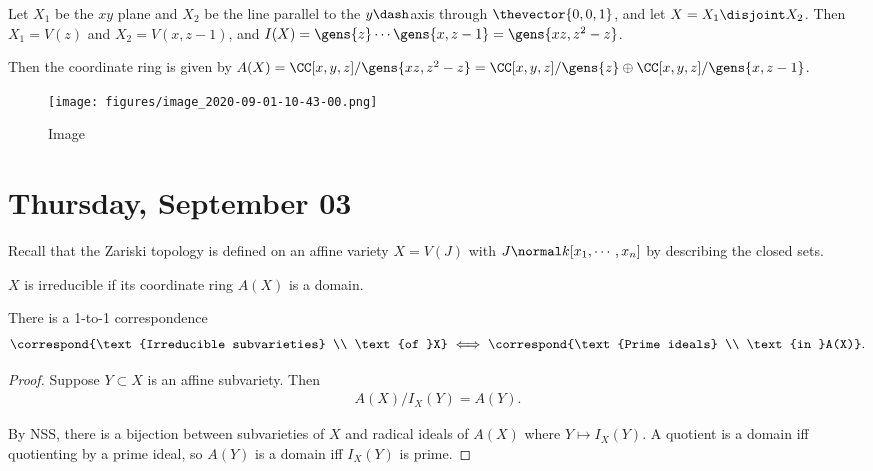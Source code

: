 \begin{example}

Let \(X_1\) be the \(xy\) plane and \(X_2\) be the line parallel to the
\(y\dash\)axis through \(\thevector{0,0,1}\), and let
\(X= X_1 \disjoint X_2\). Then \(X_1 = V(z)\) and \(X_2 = V(x, z-1)\),
and \(I(X) = \gens{z} \cdots \gens{x, z-1}= \gens{xz, z^2 - z}\).

Then the coordinate ring is given by
\(A(X) = \CC[x, y, z] / \gens{xz, z^2 - z} = \CC[x, y, z] / \gens{z} \oplus \CC[x, y,z] / \gens{x, z-1}\).

\begin{figure}
\centering
\texttt{[image: figures/image\_2020-09-01-10-43-00.png]}
\caption{Image}
\end{figure}

\end{example}

\hypertarget{thursday-september-03}{%
\section{Thursday, September 03}\label{thursday-september-03}}

Recall that the Zariski topology is defined on an affine variety
\(X = V(J)\) with \(J \normal k[x_1, \cdots, x_n]\) by describing the
closed sets.

\begin{proposition}[?]

\(X\) is irreducible if its coordinate ring \(A(X)\) is a domain.

\end{proposition}

\begin{proposition}[?]

There is a 1-to-1 correspondence
\begin{align*}  
\correspond{\text{Irreducible subvarieties} \\ \text{of }X}
\iff
\correspond{\text{Prime ideals} \\ \text{in }A(X)}
.\end{align*}

\end{proposition}

\begin{proof}

Suppose \(Y\subset X\) is an affine subvariety. Then
\begin{align*}  
A(X) / I_X(Y) = A(Y)
.\end{align*}

By NSS, there is a bijection between subvarieties of \(X\) and radical
ideals of \(A(X)\) where \(Y\mapsto I_X(Y)\). A quotient is a domain iff
quotienting by a prime ideal, so \(A(Y)\) is a domain iff \(I_X(Y)\) is
prime.

\end{proof}

